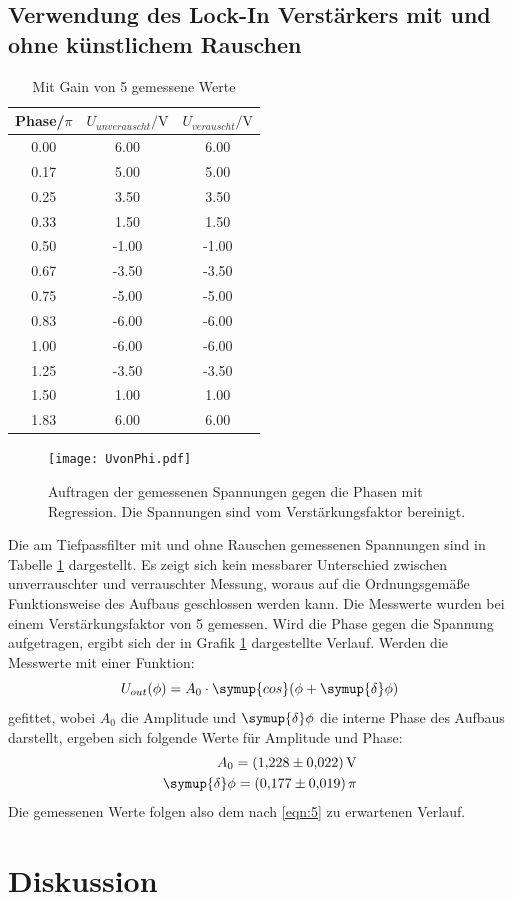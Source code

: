 \subsection{Verwendung des Lock-In Verstärkers mit und ohne künstlichem Rauschen}
\begin{table}
  \centering
  \caption{Mit Gain von 5 gemessene Werte}
  \label{tab:1}
  \begin{tabular}{c c c}
    \toprule
    Phase/$\si{\pi}$ & $U_{unverauscht}/\si{\volt}$ & $U_{verauscht}/\si{\volt}$ \\
    \midrule
    0.00 & 6.00 & 6.00 \\
    0.17 & 5.00 & 5.00 \\
    0.25 & 3.50 & 3.50 \\
    0.33 & 1.50 & 1.50 \\
    0.50 & -1.00 & -1.00 \\
    0.67 & -3.50 & -3.50 \\
    0.75 & -5.00 & -5.00 \\
    0.83 & -6.00 & -6.00 \\
    1.00 & -6.00 & -6.00 \\
    1.25 & -3.50 & -3.50 \\
    1.50 & 1.00 & 1.00 \\
    1.83 & 6.00 & 6.00 \\
    \bottomrule
  \end{tabular}
\end{table}
\begin{figure}
  \centering
     \texttt{[image: UvonPhi.pdf]}
  \caption{Auftragen der gemessenen Spannungen gegen die Phasen mit Regression. Die Spannungen sind vom Verstärkungsfaktor bereinigt.}
  \label{plot:1}
\end{figure}
Die am Tiefpassfilter mit und ohne Rauschen gemessenen Spannungen sind in Tabelle \ref{tab:1}
dargestellt. Es zeigt sich kein messbarer Unterschied zwischen unverrauschter und verrauschter Messung,
woraus auf die Ordnungsgemäße Funktionsweise des Aufbaus geschlossen werden kann.
Die Messwerte wurden bei einem Verstärkungsfaktor von 5 gemessen. Wird die Phase gegen die Spannung
aufgetragen, ergibt sich der in Grafik \ref{plot:1} dargestellte Verlauf. Werden die Messwerte mit einer
Funktion:
\begin{equation*}
  U_{out}(\phi) = A_0 \cdot \symup{cos}(\phi + \symup{\delta}\phi)
\end{equation*}
gefittet, wobei $A_0$ die Amplitude und $\symup{\delta}\phi$ die interne Phase des Aufbaus darstellt,
ergeben sich folgende Werte für Amplitude und Phase:
\begin{equation*}
  \begin{split}
    A_0 = \SI{1.228(22)}{\volt} \\
    \symup{\delta}\phi = \SI{0.177(19)}{\pi}
  \end{split}
\end{equation*}
Die gemessenen Werte folgen also dem nach \eqref{eqn:5} zu erwartenen Verlauf.

\section{Diskussion}
\newpage
\nocite{*}
\printbibliography
